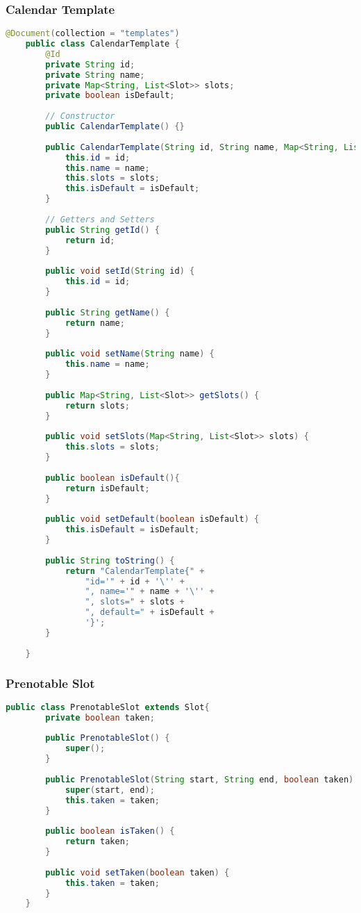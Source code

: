 \subsubsection{Calendar Template}
\begin{lstlisting}[language=java]
	@Document(collection = "templates")
	public class CalendarTemplate {
		@Id
		private String id;
		private String name;
		private Map<String, List<Slot>> slots;
		private boolean isDefault;
		
		// Constructor
		public CalendarTemplate() {}
		
		public CalendarTemplate(String id, String name, Map<String, List<Slot>> slots, boolean isDefault) {
			this.id = id;
			this.name = name;
			this.slots = slots;
			this.isDefault = isDefault;
		}
		
		// Getters and Setters
		public String getId() {
			return id;
		}
		
		public void setId(String id) {
			this.id = id;
		}
		
		public String getName() {
			return name;
		}
		
		public void setName(String name) {
			this.name = name;
		}
		
		public Map<String, List<Slot>> getSlots() {
			return slots;
		}
		
		public void setSlots(Map<String, List<Slot>> slots) {
			this.slots = slots;
		}
		
		public boolean isDefault(){
			return isDefault;
		}
		
		public void setDefault(boolean isDefault) {
			this.isDefault = isDefault;
		}
		
		public String toString() {
			return "CalendarTemplate{" +
				"id='" + id + '\'' +
				", name='" + name + '\'' +
				", slots=" + slots +
				", default=" + isDefault +
				'}';
		}
		
	}
\end{lstlisting}

\subsubsection{Prenotable Slot}
\begin{lstlisting}[language=java]
	public class PrenotableSlot extends Slot{
		private boolean taken;
		
		public PrenotableSlot() {
			super();
		}
		
		public PrenotableSlot(String start, String end, boolean taken) {
			super(start, end);
			this.taken = taken;
		}
		
		public boolean isTaken() {
			return taken;
		}
		
		public void setTaken(boolean taken) {
			this.taken = taken;
		}
	}
\end{lstlisting}

